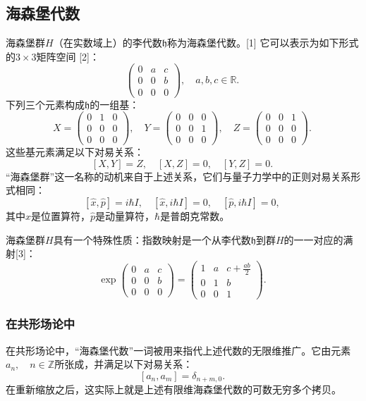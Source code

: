 \subsection{海森堡代数}
海森堡群$H$（在实数域上）的李代数$\mathfrak{h}$称为海森堡代数。[1]
它可以表示为如下形式的$3 \times 3$矩阵空间 [2]：
$$
\begin{pmatrix}
0 & a & c \\
0 & 0 & b \\
0 & 0 & 0
\end{pmatrix}, \quad a, b, c \in \mathbb{R}.~
$$
下列三个元素构成$\mathfrak{h}$的一组基：
$$
X = \begin{pmatrix}
0 & 1 & 0 \\
0 & 0 & 0 \\
0 & 0 & 0
\end{pmatrix}, \quad
Y = \begin{pmatrix}
0 & 0 & 0 \\
0 & 0 & 1 \\
0 & 0 & 0
\end{pmatrix}, \quad
Z = \begin{pmatrix}
0 & 0 & 1 \\
0 & 0 & 0 \\
0 & 0 & 0
\end{pmatrix}.~
$$
这些基元素满足以下对易关系：
$$
[X, Y] = Z, \quad [X, Z] = 0, \quad [Y, Z] = 0.~
$$
“海森堡群”这一名称的动机来自于上述关系，它们与量子力学中的正则对易关系形式相同：
$$
[\hat{x}, \hat{p}] = i \hbar I, \quad [\hat{x}, i \hbar I] = 0, \quad [\hat{p}, i \hbar I] = 0,~
$$
其中$\hat{x}$是位置算符，$\hat{p}$是动量算符，$\hbar$是普朗克常数。

海森堡群$H$具有一个特殊性质：指数映射是一个从李代数$\mathfrak{h}$到群$H$的一一对应的满射[3]：
$$
\exp \begin{pmatrix}
0 & a & c \\
0 & 0 & b \\
0 & 0 & 0
\end{pmatrix}
=
\begin{pmatrix}
1 & a & c + \tfrac{ab}{2} \\
0 & 1 & b \\
0 & 0 & 1
\end{pmatrix}.~
$$
\subsubsection{在共形场论中}
在共形场论中，“海森堡代数”一词被用来指代上述代数的无限维推广。它由元素$a_{n}, \quad n \in \mathbb{Z}$所张成，并满足以下对易关系：
$$
[a_{n}, a_{m}] = \delta_{n+m,0}.~
$$
在重新缩放之后，这实际上就是上述有限维海森堡代数的可数无穷多个拷贝。
